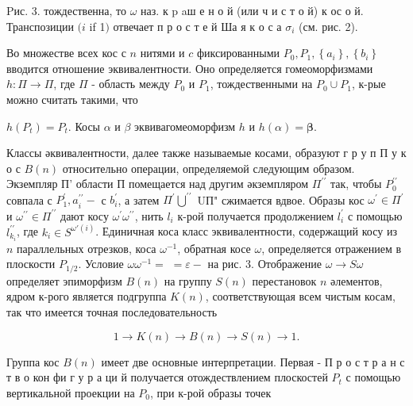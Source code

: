 \documentclass[10pt]{article}
\begin{document}
Pис. 3. тождественна, то $\omega$ наз. к $\mathrm{p}$ aш е н о й (или ч и с т о й) к ос о й. Транспозиции $(i$ if 1$)$ отвечает п р о с т е й Ша я к о с а $\sigma_{i}$ (см. рис. 2).



Во множестве всех кос с $n$ нитями и $c$ фиксированными $P_{0}, P_{1},\left\{a_{i}\right\},\left\{b_{i}\right\}$ вводится отношение эквивалентности. Оно определяется гомеоморфизмами $h: \Pi \rightarrow \Pi$, где $\Pi$ - область между $P_{0}$ и $P_{1}$, тождественными на $P_{0} \cup P_{1}$, к-рые можно считать такими, что

$h\left(P_{t}\right)=P_{t}$. Косы $\alpha$ и $\beta$ эквивагомеоморфизм $h$ и $h(\alpha)=\boldsymbol{\beta}$.



Классы әквивалентности, далее также называемые косами, образуют г р у п П у к о с $B(n)$ относительно операции, определяемой следующим образом. Экземпляр П' области П помещается над другим әкземпляром $\Pi^{\prime \prime}$ так, чтобы $P_{0}^{\prime \prime}$ совпала с $P_{1}^{\prime}, a_{i}^{\prime \prime}-$ с $b_{i}^{\prime}$, а затем $\Pi^{\prime} \bigcup^{\prime \prime}$ UП" сжимается вдвое. Образы кос $\omega^{\prime} \in \Pi^{\prime}$ и $\omega^{\prime \prime} \in \Pi^{\prime \prime}$ дают косу $\omega^{\prime} \omega^{\prime \prime}$, нить $l_{i}$ к-рой получается продолжением $l_{i}^{\prime}$ с помощью $l_{k_{i}}^{\prime \prime}$, где $k_{i} \in S^{\omega \prime(i)}$. Единичная коса класс эквивалентности, содержащий косу из $n$ параллельных отрезков, коса $\omega^{-1}$, обратная косе $\omega$, определяется отражением в плоскости $P_{1 / 2}$. Условие $\omega \omega^{-1}=$ $=\varepsilon-$ на рис. 3. Отображение $\omega \rightarrow S \omega$ определяет эпиморфизм $B(n)$ на группу $S(n)$ перестановок $n$ әлементов, ядром к-рого является подгруппа $K(n)$, соответствующая всем чистым косам, так что имеется точная последовательность



\[

1 \rightarrow K(n) \rightarrow B(n) \rightarrow S(n) \rightarrow 1 .

\]



Группа кос $B(n)$ имеет две основные интерпретации. Первая - П р о с т р а н с т в о кон фи г у р а ци й получается отождествлением плоскостей $P_{t}$ с помощью вертикальной проекции на $P_{0}$, при к-рой образы точек
\end{document}
